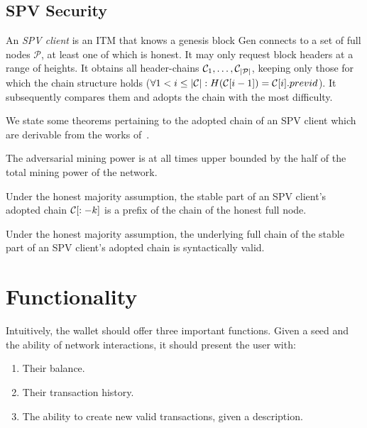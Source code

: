 \documentclass[sigconf,authordraft]{acmart}
\begin{document}
\subsection{SPV Security}
\begin{definition}
An \emph{SPV client} is an ITM that knows a genesis block \textsf{Gen} connects to a set of full nodes $\mathcal{P}$, at least one of which is honest. It may only request block headers at a range of heights. It obtains all header-chains $\mathcal{C}_1, \dots, \mathcal{C}_{|\mathcal{P}|}$, keeping only those for which the chain structure holds ($\forall 1 < i \le |\mathcal{C}|: H(\mathcal{C}[i-1]) = \mathcal{C}[i].previd$). It subsequently compares them and adopts the chain with the most difficulty.
\end{definition}

We state some theorems pertaining to the adopted chain of an SPV client which are derivable from the works of~\cite{backbone,garay2017bitcoin,pass2017analysis}.

\begin{definition}
The adversarial mining power is at all times upper bounded by the half of the total mining power of the network.
\end{definition}

\begin{theorem}
Under the honest majority assumption, the stable part of an SPV client's adopted chain $\mathcal{C}[:-k]$ is a prefix of the chain of the honest full node.
\end{theorem}

\begin{corollary}
Under the honest majority assumption, the underlying full chain of the stable part of an SPV client's adopted chain is syntactically valid.
\end{corollary}

\section{Functionality}
Intuitively, the wallet should offer three important functions. Given a seed and the ability of network interactions, it should present the user with:

\begin{enumerate}
    \item Their balance.
    \item Their transaction history.
    \item The ability to create new valid transactions, given a description.
\end{enumerate}
\end{document}

